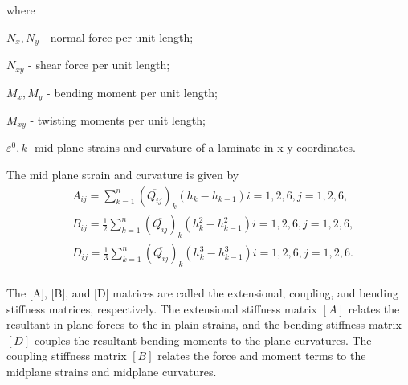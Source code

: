 where

$N_x,N_y $  - normal force per unit length;

$N_{xy} $  - shear force per unit length;

$M_x, M_y $ - bending moment per unit length;

$M_{xy} $  - twisting moments per unit length;

$\varepsilon^{0}, k $- mid plane strains and curvature of a laminate in x-y
coordinates.

The mid plane strain and curvature is given by
\begin{equation}
    \begin{split}
    &A_{ij}=\sum_{k=1}^{n}(\overline{Q_{ij}})_k(h_k-h_{k-1})  i=1,2,6, j=1,2,6,\\
    &B_{ij}=\frac{1}{2}\sum_{k=1}^{n}(\overline{Q_{ij}})_k(h_k^2 - h_{k-1}^2)
	i=1,2,6, j=1,2,6,\\
    &D_{ij}=\frac{1}{3}\sum_{k=1}^{n}(\overline{Q_{ij}})_k(h_k^3 - h_{k-1}^3)
	i=1,2,6, j=1,2,6.\\
    \end{split}
\end{equation}

The [A], [B], and [D] matrices are called the extensional, coupling, and bending stiffness matrices,
respectively. The extensional stiffness matrix $[A]$ relates the resultant in-plane forces to the
in-plain strains, and the bending stiffness matrix $[D]$ couples the resultant bending moments to
the plane curvatures.  The coupling stiffness matrix $[B]$ relates the force and moment terms to the
midplane strains and midplane curvatures.
